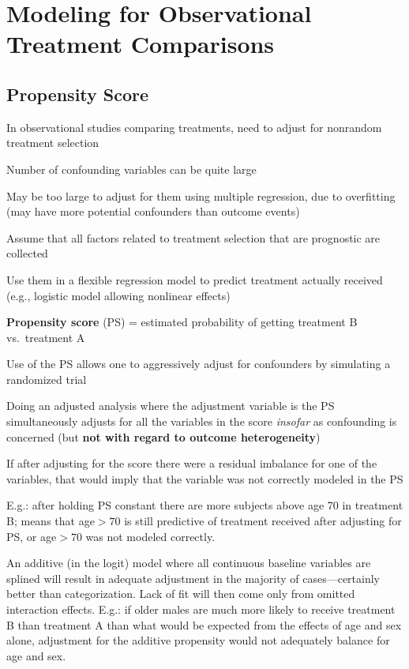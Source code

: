\chapter{Modeling for Observational Treatment Comparisons}
\section{Propensity Score}
\bi
\item In observational studies comparing treatments, need to adjust
  for nonrandom treatment selection
\item Number of confounding variables can be quite large
\item May be too large to adjust for them using multiple regression,
  due to overfitting (may have more potential confounders than 
  outcome events)
\item Assume that all factors related to treatment selection that are
  prognostic are collected
\item Use them in a flexible regression model to predict treatment
  actually received (e.g., logistic model allowing nonlinear effects)
\item \textbf{Propensity score} (PS) = estimated probability of getting
  treatment B vs.\ treatment A
\item Use of the PS allows one to aggressively
  adjust for confounders by simulating a randomized trial
\item Doing an adjusted analysis where the adjustment variable is the
  PS simultaneously adjusts for all the variables in the
  score \emph{insofar} as confounding is concerned (but \textbf{not
    with regard to outcome heterogeneity})
\item If after adjusting for the score there were a residual imbalance
  for one of the variables, that would imply that the variable was
  not correctly modeled in the PS
\item E.g.: after holding PS constant there are more subjects above
  age 70 in treatment B; means that age$>70$ is still predictive of
  treatment received after adjusting for PS, or age$>70$ was not
  modeled correctly.
\item An additive (in the logit) model where all continuous baseline
  variables are splined will result in adequate adjustment in the
  majority of cases---certainly better than categorization.  Lack of
  fit will then come only from omitted interaction effects.  E.g.: if
  older males are much more likely to receive treatment B than
  treatment A than what would be expected from the effects of age and
  sex alone, adjustment for the additive propensity would not
  adequately balance for age and sex. 
\ei

